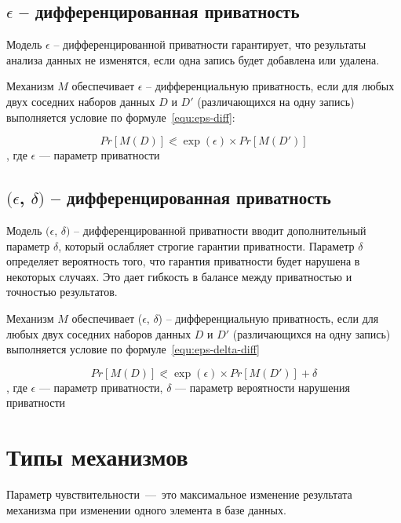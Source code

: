 \subsection{$\epsilon$ -- дифференцированная приватность}
Модель $\epsilon$ -- дифференцированной приватности гарантирует, что результаты анализа данных не изменятся, если одна запись будет добавлена или удалена.~\cite{main}

Механизм $M$ обеспечивает $\epsilon$ -- дифференциальную приватность, если для любых двух соседних наборов данных $D$ и $D'$ (различающихся на одну запись) выполняется условие по формуле~\ref{equ:eps-diff}:

\begin{equation}\label{equ:eps-diff}
	Pr[M(D)] \eqslantless \exp(\epsilon) \times Pr[M(D')]
\end{equation}
, где $\epsilon$ --- параметр приватности

\subsection{$(\epsilon$, $\delta)$ -- дифференцированная приватность}
Модель $(\epsilon$, $\delta)$ -- дифференцированной приватности вводит дополнительный параметр $\delta$, который ослабляет строгие гарантии приватности.
Параметр $\delta$ определяет вероятность того, что гарантия приватности будет нарушена в некоторых случаях.
Это дает гибкость в балансе между приватностью и точностью результатов.~\cite{main}

Механизм $M$ обеспечивает ($\epsilon$, $\delta$) -- дифференциальную приватность, если для любых двух соседних наборов данных $D$ и $D'$ (различающихся на одну запись) выполняется условие по формуле~\ref{equ:eps-delta-diff}

\begin{equation}\label{equ:eps-delta-diff}
	Pr[M(D)] \eqslantless \exp(\epsilon) \times Pr[M(D')] + \delta
\end{equation}
, где $\epsilon$ --- параметр приватности, $\delta$ --- параметр вероятности нарушения приватности



\section{Типы механизмов}

Параметр чувствительности~---~это максимальное изменение результата механизма при изменении одного элемента в базе данных.

